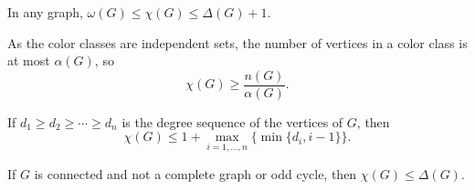 
\begin{remark}
  In any graph,
  $\omega(G) \le \chi(G) \le \Delta(G)+1$.
\end{remark}

\begin{remark}
  As the color classes are independent sets, the number of vertices in a color
  class is at most $\alpha(G)$, so
  \[
	\chi(G) \ge \frac{n(G)}{\alpha(G)}.
  \]
\end{remark}

\begin{theorem}
  If $d_1 \ge d_2 \ge \cdots \ge d_n$ is the degree sequence of the vertices of
  $G$, then
  \[
	\chi(G) \le 1 + \max_{i=1, \ldots, n} \{ \min \{d_i, i-1\} \}.
  \]
\end{theorem}

\begin{theorem}[Brooks]
  If $G$ is connected and not a complete graph or odd cycle, then $\chi(G) \le
  \Delta(G)$.
\end{theorem}

